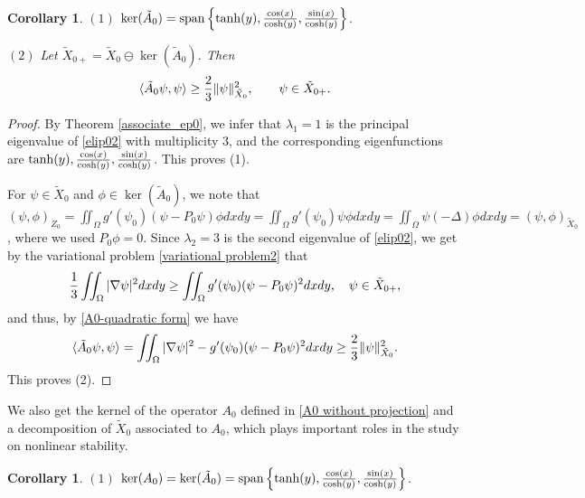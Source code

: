 \documentclass[1 [leqno, 11pt]{amsart}
\numberwithin{equation}{section}
\newtheorem{Corollary}[Theorem]{Corollary}
\begin{document}
\begin{CJK*}{GBK}{song}
\begin{Corollary}\label{kernel of  the operator tilde A0 and a decomposition of tilde X0}
$(1)$ $\ker (\tilde A_0)={\rm{span}}\left\{\tanh(y),{\cos(x)\over \cosh(y)},{\sin(x)\over \cosh(y)}\right\}$.

$(2)$ Let $\tilde X_{0+}=\tilde X_0 \ominus\ker (\tilde A_0)$. Then
\begin{align*}
\langle \tilde A_0 \psi,\psi\rangle \geq {2\over3} \| \psi\|_{\tilde X_0}^2, \quad \quad \psi\in \tilde X_{0+}.
\end{align*}
\end{Corollary}

\begin{proof}
By Theorem \ref{associate_ep0}, we infer that $\lambda_1=1$ is the principal eigenvalue of \eqref{elip02} with multiplicity $3$, and the corresponding eigenfunctions are $\tanh(y),{\cos(x)\over \cosh(y)},{\sin(x)\over \cosh(y)}$. This proves (1).

For $\psi\in\tilde X_0$ and $\phi\in\ker (\tilde A_0)$, we note that $(\psi,\phi)_{Z_0}=\iint_{\Omega}g'(\psi_0)(\psi-P_0\psi)\phi dxdy=\iint_{\Omega}g'(\psi_0)\psi\phi dxdy=\iint_{\Omega}\psi(-\Delta)\phi dxdy=(\psi,\phi)_{\tilde X_0}$, where we used $P_0\phi=0$.
Since $\lambda_2=3$ is the second eigenvalue of \eqref{elip02}, we get by the variational problem \eqref{variational problem2} that
\begin{align*}
{1\over3}\iint_{\Omega}|\nabla\psi|^2dxdy\geq\iint_{\Omega}g'(\psi_0)(\psi-P_0\psi)^2dxdy,\quad \psi\in\tilde X_{0+},
\end{align*}
and thus, by \eqref{A0-quadratic form} we have
\begin{align*}
 \langle\tilde{A}_0\psi,\psi\rangle=\iint_\Omega|\nabla\psi|^2-g'(\psi_0)(\psi - P_0\psi)^2dxdy\geq {2\over3} \| \psi\|_{\tilde X_0}^2.
\end{align*}
This proves (2).
\end{proof}
We also get  the kernel of  the operator $A_0$ defined in \eqref{A0 without projection} and a decomposition of $\tilde X_{0}$ associated to $A_0$, which plays important roles in the study on nonlinear stability.
\begin{Corollary}\label{kernel of  the operator A0 and a decomposition of tilde X0}
$(1)$ $\ker ( A_0)=\ker (\tilde A_0)={\rm{span}}\left\{\tanh(y),{\cos(x)\over \cosh(y)},{\sin(x)\over \cosh(y)}\right\}$.


\end{Corollary}
\end{CJK*}
\end{document}

